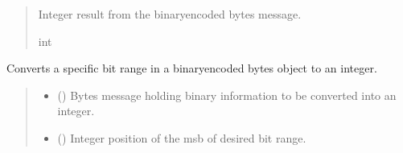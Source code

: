 \documentclass[letterpaper,10pt,english]{sphinxmanual}
\begin{document}
\begin{fulllineitems}
\begin{fulllineitems}
\begin{quote}
\begin{description}
\begin{itemize}
\end{itemize}

\sphinxAtStartPar
Integer result from the binary\sphinxhyphen{}encoded bytes message.

\sphinxAtStartPar
int

\end{description}\end{quote}

\end{fulllineitems}


\begin{fulllineitems}
\label{\detokenize{PodPacketHandling:PodPacketHandling.POD_Packets.BinaryBytesToInt_Split}}
\pysigstartsignatures
{}
\pysigstopsignatures
\sphinxAtStartPar
Converts a specific bit range in a binary\sphinxhyphen{}encoded bytes object to an integer.
\begin{quote}\begin{description}
\begin{itemize}
\item {} 
\sphinxAtStartPar
{} () \textendash{} Bytes message holding binary information to be converted into an integer.

\item {} 
\sphinxAtStartPar
{} () \textendash{} Integer position of the msb of desired bit range.


\end{itemize}
\end{description}
\end{quote}
\end{fulllineitems}
\end{fulllineitems}
\end{document}
